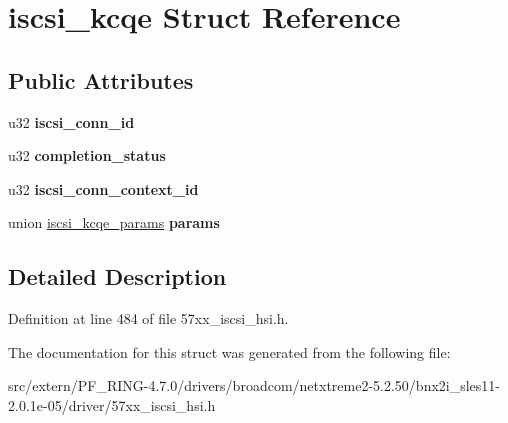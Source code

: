 \hypertarget{structiscsi__kcqe}{
\section{iscsi\_\-kcqe Struct Reference}
\label{structiscsi__kcqe}
}
\subsection*{Public Attributes}
\begin{DoxyCompactItemize}
\item 
\hypertarget{structiscsi__kcqe_a22e73d0e397e72fe2557c42a2dfc2483}{
u32 {\bfseries iscsi\_\-conn\_\-id}}
\label{structiscsi__kcqe_a22e73d0e397e72fe2557c42a2dfc2483}

\item 
\hypertarget{structiscsi__kcqe_abb0afa8bd064dc061699ce80f3adde37}{
u32 {\bfseries completion\_\-status}}
\label{structiscsi__kcqe_abb0afa8bd064dc061699ce80f3adde37}

\item 
\hypertarget{structiscsi__kcqe_af9b485df9587422f6ce8e51c44d62bde}{
u32 {\bfseries iscsi\_\-conn\_\-context\_\-id}}
\label{structiscsi__kcqe_af9b485df9587422f6ce8e51c44d62bde}

\item 
\hypertarget{structiscsi__kcqe_a3924b0f482f39a9d3a79c45a12f6aa29}{
union \hyperlink{unioniscsi__kcqe__params}{iscsi\_\-kcqe\_\-params} {\bfseries params}}
\label{structiscsi__kcqe_a3924b0f482f39a9d3a79c45a12f6aa29}

\end{DoxyCompactItemize}


\subsection{Detailed Description}


Definition at line 484 of file 57xx\_\-iscsi\_\-hsi.h.



The documentation for this struct was generated from the following file:\begin{DoxyCompactItemize}
\item 
src/extern/PF\_\-RING-\/4.7.0/drivers/broadcom/netxtreme2-\/5.2.50/bnx2i\_\-sles11-\/2.0.1e-\/05/driver/57xx\_\-iscsi\_\-hsi.h\end{DoxyCompactItemize}

